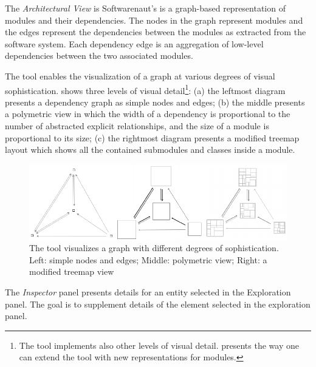 \documentclass[preprint,12pt]{elsarticle}
\begin{document}
\begin{description}
\item The {\em Architectural View} is Softwarenaut's is a graph-based representation of modules and their dependencies. The nodes in the graph represent modules and the edges represent the dependencies between the modules as extracted from the software system. Each dependency edge is an aggregation of low-level dependencies between the two associated modules. 



The tool enables the visualization of a graph at various degrees of visual sophistication.  shows three levels of visual detail\footnote{The tool implements also other levels of visual detail.  presents the way one can extend the tool with new representations for modules.}: (a) the leftmost diagram presents a dependency graph as simple nodes and edges; (b) the middle presents a polymetric view \cite{lanza-pv} in which the width of a dependency is proportional to the number of abstracted explicit relationships, and the size of a module is proportional to its size; (c) the rightmost diagram presents a modified treemap layout which shows all the contained submodules and classes inside a module. 

\begin{figure}[h]
\begin{center}
\includegraphics[width=1.04\linewidth]{sofistication}
\caption{The tool visualizes a graph with different degrees of sophistication. Left: simple nodes and edges; Middle: polymetric view; Right: a modified treemap view}
\end{center}
\end{figure}

\item The {\em Inspector} panel presents details for an entity selected in the Exploration panel. The goal is to supplement details of the element selected in the exploration panel. %


\end{description}
\end{document}
